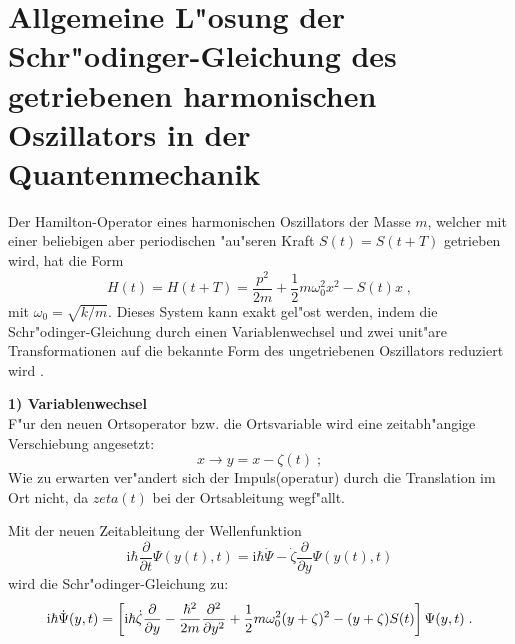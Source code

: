   \newpage



  \section{Allgemeine L"osung der Schr"odinger-Gleichung des getriebenen harmonischen Oszillators in der Quantenmechanik}
    Der Hamilton-Operator eines harmonischen Oszillators der Masse $m$, welcher mit einer beliebigen aber periodischen "au"seren Kraft $S(t)=S(t+T)$ getrieben wird, hat die Form
    \begin{equation}
      H(t) = H(t+T) = \frac{p^2}{2m} + \frac{1}{2}m\omega_0^2x^2-S(t)x \; ,
    \end{equation}
    mit $\omega_0=\sqrt{k/m}$.
    Dieses System kann exakt gel"ost werden, indem die Schr"odinger-Gleichung durch einen Variablenwechsel und zwei unit"are Transformationen auf die bekannte Form des ungetriebenen Oszillators reduziert wird \cite{haenggi}.

    \textbf{1) Variablenwechsel}\\
    F"ur den neuen Ortsoperator bzw. die Ortsvariable wird eine zeitabh"angige Verschiebung angesetzt:
    \begin{equation}
      x \rightarrow y=x-\zeta(t) \; ;
    \end{equation}
    Wie zu erwarten ver"andert sich der Impuls(operatur) durch die Translation im Ort nicht, da $zeta(t)$ bei der Ortsableitung wegf"allt.

    Mit der neuen Zeitableitung der Wellenfunktion
    \begin{equation}
      \text{i}\hbar \frac{\partial}{\partial t} \Psi(y(t),t) = \text{i}\hbar \dot{\Psi} -\dot{\zeta}\frac{\partial}{\partial y}\Psi(y(t),t)
    \end{equation}
    wird die Schr"odinger-Gleichung zu:
    \begin{equation}
      \text i \hbar \dot{\Psi}(y,t) = \left[\text i \hbar \dot{\zeta}\frac{\partial}{\partial y}-\frac{\hbar^2}{2m}\frac{\partial^2}{\partial y^2}+\frac{1}{2}m\omega_0^2(y+\zeta)^2-(y+\zeta)S(t)\right]\Psi(y,t) \; .
      \label{schroedinger_einzeln_getrieben}
    \end{equation}

